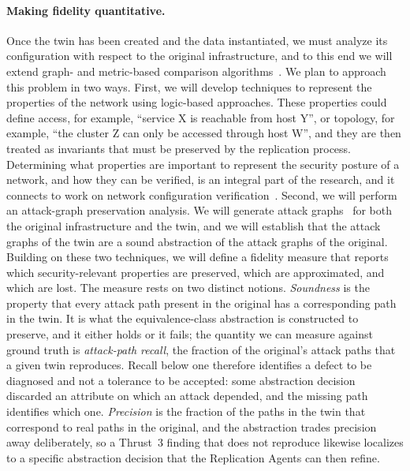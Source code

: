\paragraph{Making fidelity quantitative.}
Once the twin has been created and the data instantiated, we must analyze its
configuration with respect to the original infrastructure, and to this end we
will extend graph- and metric-based comparison algorithms~\cite{comparing}.
We plan to approach this problem in two ways. First, we will develop
techniques to represent the properties of the network using logic-based
approaches. These properties could define access, for example, ``service X is
reachable from host Y'', or topology, for example, ``the cluster Z can only
be accessed through host W'', and they are then treated as invariants that
must be preserved by the replication process. Determining what properties are
important to represent the security posture of a network, and how they can be
verified, is an integral part of the research, and it connects to work on
network configuration verification~\cite{batfish,minesweeper}.
Second, we will perform an attack-graph preservation analysis. We will
generate attack graphs~\cite{attackgraphs,mulval} for both the original
infrastructure and the twin, and we will establish that the attack graphs of
the twin are a sound abstraction of the attack graphs of the original.
Building on these two techniques, we will define a fidelity measure that
reports which security-relevant properties are preserved, which are
approximated, and which are lost. The measure rests on two distinct notions.
\emph{Soundness} is the property that every attack path present in the
original has a corresponding path in the twin. It is what the
equivalence-class abstraction is constructed to preserve, and it either holds
or it fails; the quantity we can measure against ground truth is
\emph{attack-path recall}, the fraction of the original's attack paths that a
given twin reproduces. Recall below one therefore identifies a defect to be
diagnosed and not a tolerance to be accepted: some abstraction decision
discarded an attribute on which an attack depended, and the missing path
identifies which one. \emph{Precision} is the fraction of the paths in the
twin that correspond to real paths in the original, and the abstraction trades
precision away deliberately, so a Thrust~3 finding that does not reproduce
likewise localizes to a specific abstraction decision that the Replication
Agents can then refine. 


